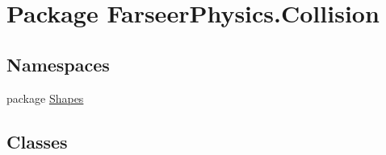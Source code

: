 \hypertarget{namespace_farseer_physics_1_1_collision}{\section{Package Farseer\+Physics.\+Collision}
\label{namespace_farseer_physics_1_1_collision}
}
\subsection*{Namespaces}
\begin{DoxyCompactItemize}
\item 
package \hyperlink{namespace_farseer_physics_1_1_collision_1_1_shapes}{Shapes}
\end{DoxyCompactItemize}
\subsection*{Classes}
